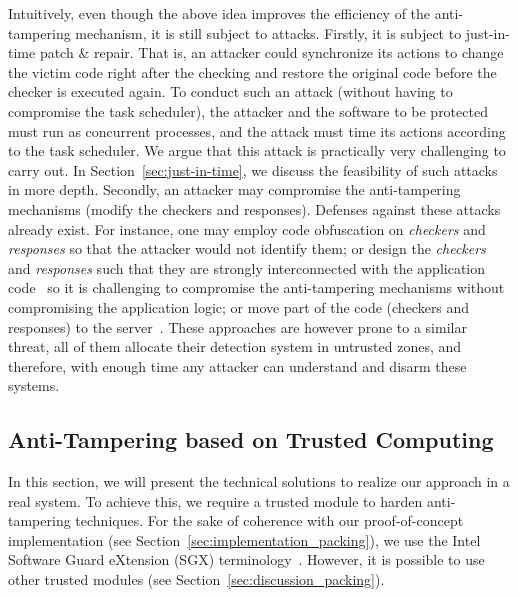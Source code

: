 Intuitively, even though the above idea improves the efficiency of the 
anti-tampering mechanism, it is still subject to attacks. Firstly, it is 
subject to just-in-time patch \& repair. That is, an attacker could synchronize 
its actions to change the victim code right after the checking and restore the 
original code before the checker is executed again.
To conduct such an attack (without having to compromise the task scheduler), 
the attacker and the software to be protected must run as concurrent processes, 
and the attack must time its actions according to the task scheduler.
We argue that this attack is practically very challenging to carry out.
In Section~\ref{sec:just-in-time}, we discuss the feasibility of such attacks 
in more depth.
Secondly, an attacker may compromise the anti-tampering mechanisms (\ie modify 
the checkers and responses). 
Defenses against these attacks already exist.
For instance, one may employ code obfuscation on \emph{checkers} and 
\emph{responses} so that the attacker would not identify them; or design the 
\emph{checkers} and \emph{responses} such that they are strongly interconnected 
with the application code~\citep{biondi2006silver} so it is challenging to 
compromise the anti-tampering mechanisms without compromising the application 
logic; or move part of the code (\eg checkers and responses) to the 
server~\citep{viticchie2016reactive}.
These approaches are however prone to a similar threat, \ie all of them 
allocate their detection system in untrusted zones, 
and therefore, with enough time any attacker can understand and disarm these 
systems.

\subsection{Anti-Tampering based on Trusted Computing}

In this section, we will present the technical solutions to realize our 
approach in a real system.
To achieve this, we require a trusted module to harden anti-tampering 
techniques.
For the sake of coherence with our proof-of-concept implementation (see 
Section~\ref{sec:implementation_packing}), we use the Intel Software Guard 
eXtension (SGX) terminology~\citep{rozas2013intel}.
However, it is possible to use other trusted modules (see 
Section~\ref{sec:discussion_packing}).

